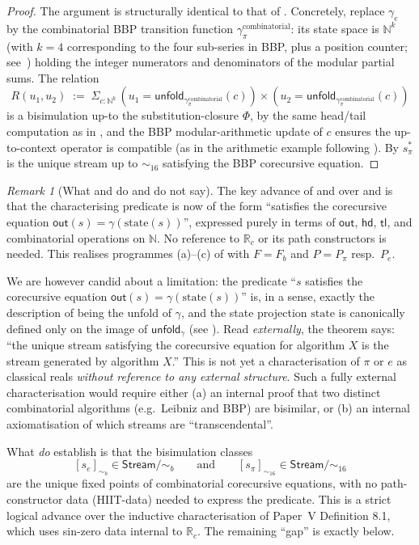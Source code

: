 \documentclass[12pt]{article}
\theoremstyle{definition}
\theoremstyle{remark}
\newtheorem{remark}[theorem]{Remark}
\newcommand{\N}{\mathbb{N}}
\newcommand{\R}{\mathbb{R}}
\newcommand{\Rc}{\R_c}
\newcommand{\Stream}{\mathsf{Stream}}
\newcommand{\hd}{\mathsf{hd}}
\newcommand{\tl}{\mathsf{tl}}
\newcommand{\out}{\mathsf{out}}
\newcommand{\unfold}{\mathsf{unfold}}
\newcommand{\bisim}{\mathrel{\sim}}
\begin{document}
\begin{proof}
The argument is structurally identical to that of
. Concretely, replace $\gamma_e$ by the
combinatorial BBP transition function $\gamma_\pi^{\text{combinatorial}}$:
its state space is $\N^k$ (with $k=4$ corresponding to the four
sub-series in BBP, plus a position counter; see~\cite{bbp})
holding the integer numerators and denominators of the modular
partial sums. The relation
\[
R(u_1, u_2) \;:=\; \Sigma_{c:\N^k}\,
  ( u_1 = \unfold_{\gamma_\pi^{\text{combinatorial}}}(c))\times
  ( u_2 = \unfold_{\gamma_\pi^{\text{combinatorial}}}(c))
\]
is a bisimulation up-to the substitution-closure $\Phi$, by the
same head/tail computation as in , and the
BBP modular-arithmetic update of $c$ ensures the up-to-context
operator is compatible (as in the arithmetic example following
). By 
$s^*_\pi$ is the unique stream up to $\bisim_{16}$ satisfying the
BBP corecursive equation.
\end{proof}

\begin{remark}[What  and  do and do not say]
\label{rem:internal-scope}
The key advance of  and 
over  and  is that the
characterising predicate is now of the form ``satisfies the
corecursive equation $\out(s) = \gamma(\mathrm{state}(s))$'',
expressed purely in terms of $\out$, $\hd$, $\tl$, and
combinatorial operations on $\N$.
No reference to $\Rc$ or its path constructors is needed. This
realises programmes (a)--(c) of \cite[\S 9.2]{paperIII} with
$F = F_b$ and $P = P_\pi$ resp.\ $P_e$.

We are however candid about a limitation: the predicate
``$s$ satisfies the corecursive equation
$\out(s)=\gamma(\mathrm{state}(s))$'' is, in a sense, exactly the
description of being the unfold of $\gamma$, and the state
projection $\mathrm{state}$ is canonically defined only on the
image of $\unfold_\gamma$ (see ). Read
\emph{externally}, the theorem says: ``the unique stream
satisfying the corecursive equation for algorithm $X$ is the
stream generated by algorithm $X$.'' This is not yet a
characterisation of $\pi$ or $e$ as classical reals \emph{without
reference to any external structure}. Such a fully external
characterisation would require either (a) an internal proof that
two distinct combinatorial algorithms (e.g.\ Leibniz and BBP) are
bisimilar, or (b) an internal axiomatisation of which streams
are ``transcendental''.

What  \emph{do} establish
is that the bisimulation classes
\[
  [s_e]_{\bisim_b} \in \Stream/{\bisim_b}
  \qquad\text{and}\qquad
  [s_\pi]_{\bisim_{16}} \in \Stream/{\bisim_{16}}
\]
are the unique fixed points of combinatorial corecursive
equations, with no path-constructor data (HIIT-data) needed to
express the predicate.
This is a strict logical advance over the inductive
characterisation of Paper~V Definition 8.1, which uses sin-zero
data internal to $\Rc$. The remaining ``gap'' is exactly
 below.
\end{remark}
\end{document}
